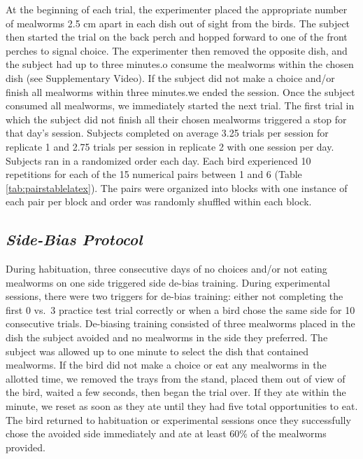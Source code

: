 \documentclass[
  ,pub,floatsintext]{apa6}
\begin{document}
At the beginning of each trial, the experimenter placed the appropriate number of mealworms 2.5 cm apart in each dish out of sight from the birds. The subject then started the trial on the back perch and hopped forward to one of the front perches to signal choice. The experimenter then removed the opposite dish, and the subject had up to three minutes.o consume the mealworms within the chosen dish (see Supplementary Video). If the subject did not make a choice and/or finish all mealworms within three minutes.we ended the session. Once the subject consumed all mealworms, we immediately started the next trial. The first trial in which the subject did not finish all their chosen mealworms triggered a stop for that day's session. Subjects completed on average 3.25 trials per session for replicate 1 and 2.75 trials per session in replicate 2 with one session per day. Subjects ran in a randomized order each day. Each bird experienced 10 repetitions for each of the 15 numerical pairs between 1 and 6 (Table \ref{tab:pairstablelatex}). The pairs were organized into blocks with one instance of each pair per block and order was randomly shuffled within each block.

\hypertarget{side-bias-protocol}{%
\subsection{\texorpdfstring{\emph{Side-Bias Protocol}}{Side-Bias Protocol}}\label{side-bias-protocol}}

During habituation, three consecutive days of no choices and/or not eating mealworms on one side triggered side de-bias training. During experimental sessions, there were two triggers for de-bias training: either not completing the first 0 vs.~3 practice test trial correctly or when a bird chose the same side for 10 consecutive trials. De-biasing training consisted of three mealworms placed in the dish the subject avoided and no mealworms in the side they preferred. The subject was allowed up to one minute to select the dish that contained mealworms. If the bird did not make a choice or eat any mealworms in the allotted time, we removed the trays from the stand, placed them out of view of the bird, waited a few seconds, then began the trial over. If they ate within the minute, we reset as soon as they ate until they had five total opportunities to eat. The bird returned to habituation or experimental sessions once they successfully chose the avoided side immediately and ate at least 60\% of the mealworms provided.
\end{document}
